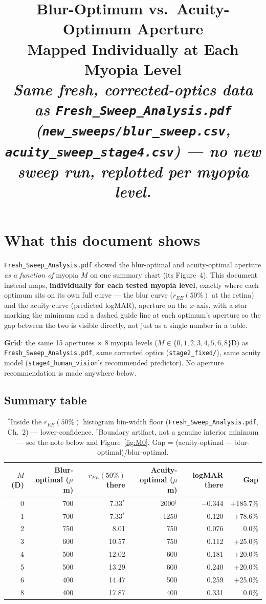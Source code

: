 \documentclass[10.5pt]{report}
\title{\textbf{\Large Blur-Optimum vs.\ Acuity-Optimum Aperture}\\[0.2cm]
\textcolor{hbblue}{\large Mapped Individually at Each Myopia Level}\\[0.3cm]
\normalsize\itshape Same fresh, corrected-optics data as
\texttt{Fresh\_Sweep\_Analysis.pdf} (\texttt{new\_sweeps/blur\_sweep.csv},
\texttt{acuity\_sweep\_stage4.csv}) --- no new sweep run, replotted per myopia level.}
\author{}
\date{}
\begin{document}
\maketitle
\tableofcontents

\chapter{What this document shows}

\texttt{Fresh\_Sweep\_Analysis.pdf} showed the blur-optimal and acuity-optimal
aperture \emph{as a function of} myopia $M$ on one summary chart (its Figure~4).
This document instead maps, \textbf{individually for each tested myopia level},
exactly where each optimum sits on its own full curve --- the blur curve
($r_{EE}(50\%)$ at the retina) and the acuity curve (predicted logMAR), aperture on
the $x$-axis, with a star marking the minimum and a dashed guide line at each
optimum's aperture so the gap between the two is visible directly, not just as a
single number in a table.

\textbf{Grid}: the same 15 apertures $\times$ 8 myopia levels
($M\in\{0,1,2,3,4,5,6,8\}$D) as \texttt{Fresh\_Sweep\_Analysis.pdf}, same corrected
optics (\texttt{stage2\_fixed/}), same acuity model (\texttt{stage4\_human\_vision}'s
recommended predictor). No aperture recommendation is made anywhere below.

\section{Summary table}

\begin{table}[htbp]
\centering
\begin{tabular}{rrrrrr}
\toprule
$M$ (D) & Blur-optimal ($\mu$m) & $r_{EE}(50\%)$ there & Acuity-optimal ($\mu$m) & logMAR there & Gap \\
\midrule
0 & 700 & 7.33$^{\ast}$  & 2000$^{\dagger}$ & $-$0.344 & +185.7\% \\
1 & 700 & 7.33$^{\ast}$  & 1250  & $-$0.120 & +78.6\% \\
2 & 750 & 8.01  & 750  & 0.076 & 0.0\% \\
3 & 600 & 10.57 & 750  & 0.112 & +25.0\% \\
4 & 500 & 12.02 & 600  & 0.181 & +20.0\% \\
5 & 500 & 13.29 & 600  & 0.240 & +20.0\% \\
6 & 400 & 14.47 & 500  & 0.259 & +25.0\% \\
8 & 400 & 17.87 & 400  & 0.331 & 0.0\% \\
\bottomrule
\end{tabular}
\caption{$^{\ast}$Inside the $r_{EE}(50\%)$ histogram bin-width floor
(\texttt{Fresh\_Sweep\_Analysis.pdf}, Ch.~2) --- lower-confidence. $^{\dagger}$Boundary
artifact, not a genuine interior minimum --- see the note below and
Figure~\ref{fig:M0}. Gap = (acuity-optimal $-$ blur-optimal)/blur-optimal.}
\end{table}
\end{document}
